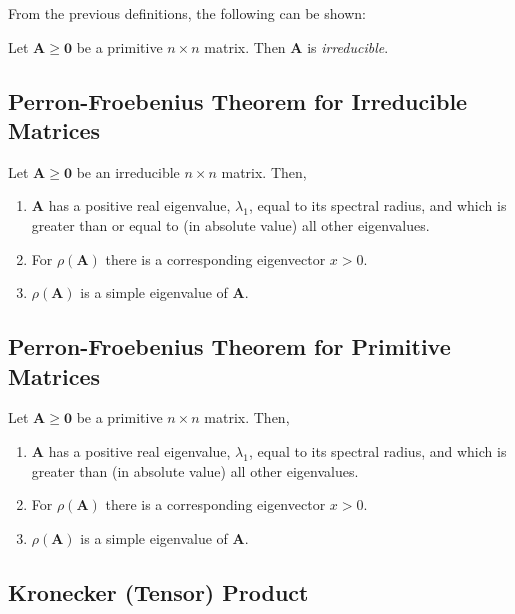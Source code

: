 From the previous definitions, the following can be shown:
\begin{lemma}
	Let $\mathbf{A} \ge \mathbf{0}$ be a primitive $n \times n$ matrix. Then $\mathbf{A}$ is \textit{irreducible}.
\end{lemma}

\subsection{Perron-Froebenius Theorem for Irreducible Matrices}

\begin{theorem}
Let $\mathbf{A} \ge \mathbf{0}$ be an irreducible $n \times n$ matrix. Then,
	\begin{enumerate}
		\item $\mathbf{A}$ has a positive real eigenvalue, $\lambda_{1}$, equal to its spectral radius, and which is greater than or equal to (in absolute value) all other eigenvalues.
		\item For $\rho(\mathbf{A})$ there is a corresponding eigenvector $x > 0$.
		\item $\rho(\mathbf{A})$ is a simple eigenvalue of $\mathbf{A}$.
	\end{enumerate}
\end{theorem}

\subsection{Perron-Froebenius Theorem for Primitive Matrices}

\begin{theorem}
Let $\mathbf{A} \ge \mathbf{0}$ be a primitive $n \times n$ matrix. Then,
	\begin{enumerate}
		\item $\mathbf{A}$ has a positive real eigenvalue, $\lambda_{1}$, equal to its spectral radius, and which is greater than (in absolute value) all other eigenvalues.
		\item For $\rho(\mathbf{A})$ there is a corresponding eigenvector $x > 0$.
		\item $\rho(\mathbf{A})$ is a simple eigenvalue of $\mathbf{A}$.
	\end{enumerate}
\end{theorem}

\subsection{Kronecker (Tensor) Product}

